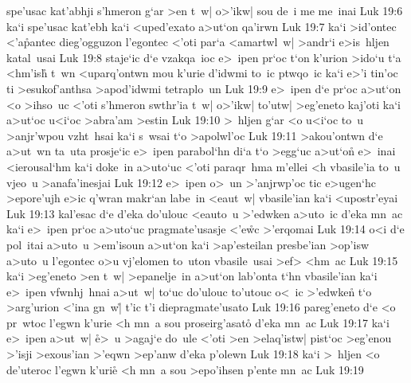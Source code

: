 spe'usac
kat'abhji
s'hmeron
g`ar
>en
t~w|
o>'ikw|
sou
de~i
me
me~inai\bibvsend
\vs Luk 19:6
ka`i
spe'usac
kat'ebh
ka`i
<uped'exato
a>ut`on
qa'irwn\bibvsend
\vs Luk 19:7
ka`i
>id'ontec
<'a\r{p}antec
dieg'ogguzon
l'egontec
<'oti
par`a
<amartwl~w|
>andr`i
e>is~hljen
katal~usai\bibvsend
\vs Luk 19:8
staje`ic
d`e
vzakqa~ioc
e>~ipen
pr`oc
t`on
k'urion
>ido`u
t`a
<hm'ish\r{}
t~wn
<uparq'ontwn
mou
k'urie
d'idwmi
to~ic
ptwqo~ic
ka`i
e>'i
tin'oc
ti
>esukof'anthsa
>apod'idwmi
tetraplo~un\bibvsend
\vs Luk 19:9
e>~ipen
d`e
pr`oc
a>ut`on
<o
>ihso~uc
<'oti
s'hmeron
swthr'ia
t~w|
o>'ikw|
to'utw|
>eg'eneto
kaj'oti
ka`i
a>ut`oc
u<i`oc
>abra'am
>estin\bibvsend
\vs Luk 19:10
>~hljen
g`ar
<o
u<i`oc
to~u
>anjr'wpou
vzht~hsai
ka`i
s~wsai
t`o
>apolwl'oc\bibvsend
\vs Luk 19:11
>akou'ontwn
d`e
a>ut~wn
ta~uta
prosje`ic
e>~ipen
parabol`hn
di`a
t`o
>egg`uc
a>ut`on\r{}
e>~inai
<ierousal`hm
ka`i
doke~in
a>uto`uc
<'oti
paraqr~hma
m'ellei
<h
vbasile'ia
to~u
vjeo~u
>anafa'inesjai\bibvsend
\vs Luk 19:12
e>~ipen
o>~un
>'anjrwp'oc
tic
e>ugen`hc
>epore'ujh
e>ic
q'wran
makr`an
labe~in
<eaut~w|
vbasile'ian
ka`i
<upostr'eyai\bibvsend
\vs Luk 19:13
kal'esac
d`e
d'eka
do'ulouc
<eauto~u
>'edwken
a>uto~ic
d'eka
mn~ac
ka`i
e>~ipen
pr`oc
a>uto`uc
pragmate'usasje
<'e\r{w}c
>'erqomai\bibvsend
\vs Luk 19:14
o<i
d`e
pol~itai
a>uto~u
>em'isoun
a>ut`on
ka`i
>ap'esteilan
presbe'ian
>op'isw
a>uto~u
l'egontec
o>u
vj'elomen
to~uton
vbasile~usai
>ef>
<hm~ac\bibvsend
\vs Luk 19:15
ka`i
>eg'eneto
>en
t~w|
>epanelje~in
a>ut`on
lab'onta
t`hn
vbasile'ian
ka`i
e>~ipen
vfwnhj~hnai
a>ut~w|
to`uc
do'ulouc
to'utouc
o<~ic
>'edwke\r{n}
t`o
>arg'urion
<'ina
gn~w|\r{}
t'ic
t'i
diepragmate'usato\bibvsend
\vs Luk 19:16
pareg'eneto
d`e
<o
pr~wtoc
l'egwn
k'urie
<h
mn~a
sou
proseirg'asato\r{}
d'eka
mn~ac\bibvsend
\vs Luk 19:17
ka`i
e>~ipen
a>ut~w|
\r{e}>~u
>agaj`e
do~ule
<'oti
>en
>elaq'istw|
pist`oc
>eg'enou
>'isji
>exous'ian
>'eqwn
>ep'anw
d'eka
p'olewn\bibvsend
\vs Luk 19:18
ka`i
>~hljen
<o
de'uteroc
l'egwn
k'urie\r{}
<h
mn~a
sou
>epo'ihsen
p'ente
mn~ac\bibvsend
\vs Luk 19:19
